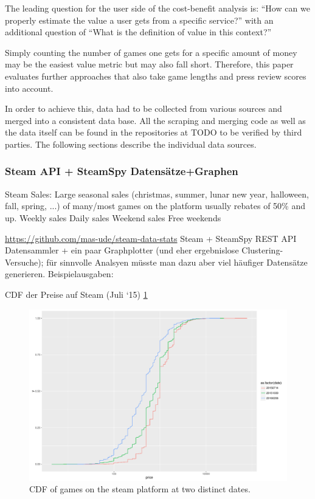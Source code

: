 The leading question for the user side of the cost-benefit analysis is: ``How can we properly estimate the value a user gets from a specific service?'' with an additional question of ``What is the definition of value in this context?''

Simply counting the number of games one gets for a specific amount of money may be the easiest value metric but may also fall short. Therefore, this paper evaluates further approaches that also take game lengths and press review scores into account.

In order to achieve this, data had to be collected from various sources and merged into a consistent data base. All the scraping and merging code as well as the data itself can be found in the repositories at TODO to be verified by third parties. The following sections describe the individual data sources.

\subsubsection{Steam API + SteamSpy Datensätze+Graphen}

Steam Sales:
Large seasonal sales (christmas, summer, lunar new year, halloween, fall, spring, ...) of many/most games on the platform usually rebates of 50\% and up.
Weekly sales
Daily sales
Weekend sales
Free weekends



\url{https://github.com/mas-ude/steam-data-stats} Steam + SteamSpy REST API Datensammler + ein paar Graphplotter (und eher ergebnislose Clustering-Versuche); für sinnvolle Analsyen müsste man dazu aber viel häufiger Datensätze generieren. Beispielausgaben:

CDF der Preise auf Steam (Juli ‘15) \ref{fig:steam-prices}

\begin{figure}[!t]
	\centering
	\includegraphics[width=1.0\columnwidth]{images/steam-prices.pdf}
	\caption{CDF of games on the steam platform at two distinct dates.}
\label{fig:steam-prices}
\end{figure}

